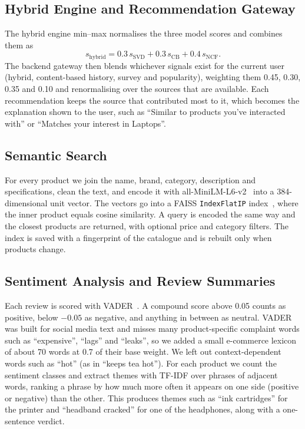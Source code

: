 \documentclass[conference]{IEEEtran}
\begin{document}
\subsection{Hybrid Engine and Recommendation Gateway}
The hybrid engine min--max normalises the three model scores and combines them as
\begin{equation}
s_{\text{hybrid}} = 0.3\,s_{\text{SVD}} + 0.3\,s_{\text{CB}} + 0.4\,s_{\text{NCF}}.
\end{equation}
The backend gateway then blends whichever signals exist for the current user (hybrid, content-based history, survey and popularity), weighting them 0.45, 0.30, 0.35 and 0.10 and renormalising over the sources that are available. Each recommendation keeps the source that contributed most to it, which becomes the explanation shown to the user, such as ``Similar to products you've interacted with'' or ``Matches your interest in Laptops''.

\subsection{Semantic Search}
For every product we join the name, brand, category, description and specifications, clean the text, and encode it with all-MiniLM-L6-v2~\cite{reimers2019} into a 384-dimensional unit vector. The vectors go into a FAISS \texttt{IndexFlatIP} index~\cite{johnson2019}, where the inner product equals cosine similarity. A query is encoded the same way and the closest products are returned, with optional price and category filters. The index is saved with a fingerprint of the catalogue and is rebuilt only when products change.

\subsection{Sentiment Analysis and Review Summaries}
Each review is scored with VADER~\cite{hutto2014}. A compound score above 0.05 counts as positive, below $-0.05$ as negative, and anything in between as neutral. VADER was built for social media text and misses many product-specific complaint words such as ``expensive'', ``lags'' and ``leaks'', so we added a small e-commerce lexicon of about 70 words at 0.7 of their base weight. We left out context-dependent words such as ``hot'' (as in ``keeps tea hot''). For each product we count the sentiment classes and extract themes with TF-IDF over phrases of adjacent words, ranking a phrase by how much more often it appears on one side (positive or negative) than the other. This produces themes such as ``ink cartridges'' for the printer and ``headband cracked'' for one of the headphones, along with a one-sentence verdict.
\end{document}

